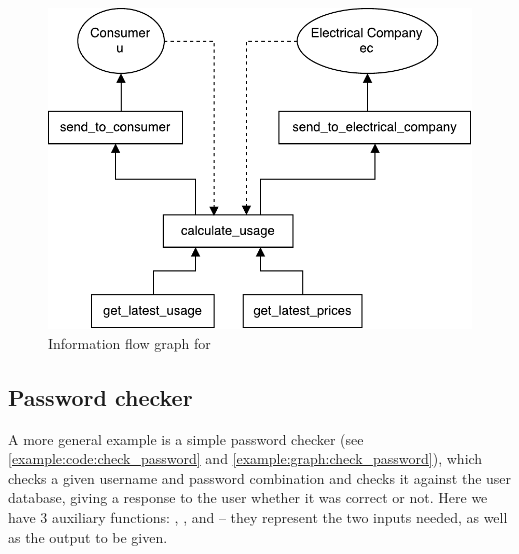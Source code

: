 
\begin{figure}
  \centering
  \includegraphics[scale=0.8]{figures/dlm_calculate_bill}
  \caption{Information flow graph for }
  \label{example:graph:calculate_bill}
\end{figure}

\subsection{Password checker}\label{example:sec:check_password}
A more general example is a simple password checker (see \cref{example:code:check_password} and \cref{example:graph:check_password}), which checks a given username and password combination and checks it against the user database, giving a response to the user whether it was correct or not.
Here we have 3 auxiliary functions: , , and  -- they represent the two inputs needed, as well as the output to be given.

